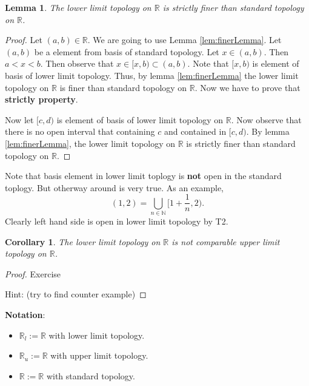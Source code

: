 \documentclass[
]{book}
\providecommand{\tightlist}{%
  \setlength{\itemsep}{0pt}\setlength{\parskip}{0pt}}
\newtheorem{lemma}{Lemma}[chapter]
\newtheorem{corollary}{Corollary}[chapter]
\theoremstyle{definition}
\theoremstyle{definition}
\theoremstyle{definition}
\theoremstyle{definition}
\theoremstyle{remark}
\begin{document}
\begin{lemma}
\protect\hypertarget{lem:unnamed-chunk-26}{}\label{lem:unnamed-chunk-26}The lower limit topology on \(\mathbb{R}\) is strictly finer than standard topology on \(\mathbb{R}\).
\end{lemma}

\begin{proof}
Let \((a,b)\in \mathbb{R}\). We are going to use Lemma \ref{lem:finerLemma}. Let \((a,b)\) be a element from basis of standard topology. Let \(x\in (a,b)\). Then \(a<x<b\). Then observe that \(x\in [x,b)\subset (a,b)\). Note that \([x,b)\) is element of basis of lower limit topology. Thus, by lemma \ref{lem:finerLemma} the lower limit topology on \(\mathbb{R}\) is finer than standard topology on \(\mathbb{R}\). Now we have to prove that \textbf{strictly property}.

Now let \([c,d)\) is element of basis of lower limit topology on \(\mathbb{R}\). Now observe that there is no open interval that containing \(c\) and contained in \([c,d)\). By lemma \ref{lem:finerLemma}, the lower limit topology on \(\mathbb{R}\) is strictly finer than standard topology on \(\mathbb{R}\).
\end{proof}

Note that basis element in lower limit toplogy is \textbf{not} open in the standard toplogy. But otherway around is very true. As an example, \[(1,2)=\bigcup_{n\in \mathbb{N}}[1+\frac{1}{n},2).\] Clearly left hand side is open in lower limit topology by T2.

\begin{corollary}
\protect\hypertarget{cor:unnamed-chunk-28}{}\label{cor:unnamed-chunk-28}The lower limit topology on \(\mathbb{R}\) is not comparable upper limit topology on \(\mathbb{R}\).
\end{corollary}

\begin{proof}
Exercise

Hint: (try to find counter example)
\end{proof}

\textbf{Notation}:

\begin{itemize}
\tightlist
\item
  \(\mathbb{R}_l:=\mathbb{R}\) with lower limit topology.
\item
  \(\mathbb{R}_u:=\mathbb{R}\) with upper limit topology.
\item
  \(\mathbb{R}:=\mathbb{R}\) with standard topology.
\end{itemize}
\end{document}
